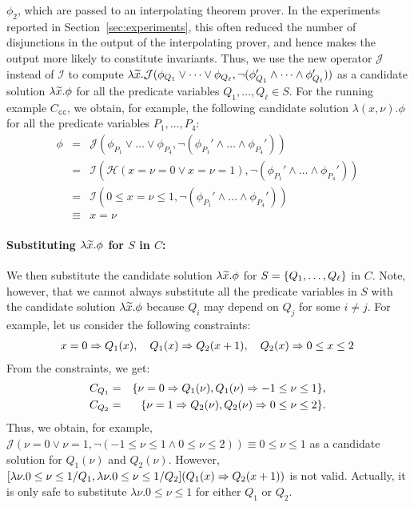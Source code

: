 \(\phi_2\), which are passed to an interpolating theorem prover.
In the experiments reported in Section~\ref{sec:experiments}, this often
reduced the number of disjunctions in the output of the interpolating
prover, and hence makes the output more likely to constitute invariants.
%
Thus, we use the new operator \(\mathcal{J}\) instead of \(\mathcal{I}\) 
to compute \(\lambda \widetilde{x}. \mathcal{J}(\phi_{Q_1} \lor \dots\lor 
\phi_{Q_{\ell}},\neg (\phi_{Q_1}' \land \dots \land\phi_{Q_{\ell}}'))\) 
as a candidate solution \(\lambda \widetilde{x}. \phi\) for all the predicate 
variables \(Q_1,\dots,Q_{\ell} \in S\).  For the running example 
\(C_{\texttt{cc}}\), we obtain, for example, the following candidate 
solution \(\lambda (x, \nu). \phi\) for all the predicate variables 
\(P_1,\dots,P_4\):
\begin{eqnarray*}
\phi&=& \mathcal{J}(\phi_{P_1} \lor \dots \lor \phi_{P_4},\neg (\phi_{P_1}' \land \dots \land \phi_{P_4}')) \\
&=& \mathcal{I}(\mathcal{H}(x=\nu=0 \lor x=\nu=1),\neg (\phi_{P_1}' \land \dots \land \phi_{P_4}')) \\
&=& \mathcal{I}(0 \leq x=\nu \leq 1,\neg (\phi_{P_1}' \land \dots \land \phi_{P_4}')) \\
&\equiv& x=\nu
\end{eqnarray*}

\paragraph{Substituting \(\lambda \widetilde{x}.\phi\) for \(S\) in \(C\):}
We then substitute the candidate solution \(\lambda \widetilde{x}.\phi\) for 
\(S=\{{Q_1,\dots,Q_{\ell}}\}\) in \(C\).  Note, however, that we cannot 
always substitute all the predicate variables in \(S\) with the 
candidate solution \(\lambda\widetilde{x}.\phi\) because \(Q_i\) may depend on 
\(Q_j\) for some \(i \neq j\).  For example, let us consider the 
following constraints:
\begin{eqnarray*}
x=0 \Rightarrow Q_1(x), \quad
Q_1(x) \Rightarrow Q_2(x+1), \quad
Q_2(x) \Rightarrow 0 \leq x \leq 2
\end{eqnarray*}
From the constraints, we get:
\begin{eqnarray*}
C_{Q_1}&=&\{\nu=0 \Rightarrow Q_1(\nu), Q_1(\nu) \Rightarrow -1 \leq \nu\leq 1\}, \\
C_{Q_2}&=&\{\nu=1 \Rightarrow Q_2(\nu), Q_2(\nu) \Rightarrow 0 \leq \nu \leq 2\}.
\end{eqnarray*}
Thus, we obtain, for example, \(\mathcal{J}(\nu=0 \lor \nu=1,\neg (-1 
\leq \nu\leq 1 \land 0 \leq \nu \leq 2)) \equiv 0 \leq \nu \leq 1\) as a 
candidate solution for \(Q_1(\nu)\) and \(Q_2(\nu)\).  However, 
\([\lambda\nu.0 \leq \nu \leq 1/Q_1,\lambda \nu.0 \leq \nu \leq 
1/Q_2](Q_1(x) \Rightarrow Q_2(x+1))\) is not valid.  Actually, it is only 
safe to substitute \(\lambda \nu.0 \leq \nu\leq 1\) for either \(Q_1\) 
or \(Q_2\).

